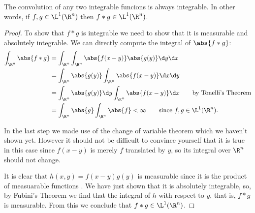 \documentclass[12pt,oneside]{book}
\begin{document}
\begin{proposition}
	The convolution of any two integrable funcions is always integrable. In other words, if
	\( f, g \in \L^1(\R^n) \) then \( f \ast g \in \L^1(\R^n) \).
\end{proposition}
\begin{proof}
	To show that \( f \ast g \) is integrable we need to show that it is measurable and
	absolutely integrable. We can directly compute the integral of \(
	\abs{f \ast g }	\):
	\begin{align*}
		\int_{\R^n} \abs{f \ast g} & = \int_{\R^n} \int_{\R^n} \abs{f(x - y)} \abs{g(y)} \d y \d
		x \\
															 & = \int_{\R^n} \abs{g(y)} \int_{\R^n} \abs{f(x - y)} \d x
															 \d y \\
															 & = \int_{\R^n} \abs{g(y)} \d y \int_{\R^n} \abs{f(x - y)}
															 \d x \tag*{by Tonelli's Theorem} \\
															 & = \int_{\R^n} \abs{g} \int_{\R^n} \abs{f} < \infty
															 \tag*{since \( f,g \in \L^1(\R^n). \)}
	\end{align*}

	In the last step we made use of the change of variable theorem which we haven't shown yet.
	However it should not be difficult to convince yourself that it is true in this case since
	\( f(x - y) \) is merely \( f \) translated by \( y \), so its integral over \( \R^n \)
	should not change. 

	It is clear that \( h(x,y) = f(x - y)g(y) \) is measurable since it is the product of
	measuarable functions . We have just shown that it is absolutely integrable, so, by
	Fubini's Theorem we find that the integral of \( h \) with respect to \( y \), that is,
	\( f \ast g \) is measurable. From this we conclude that \( f \ast g \in \L^1(\R^n) \).
\end{proof}
\end{document}
